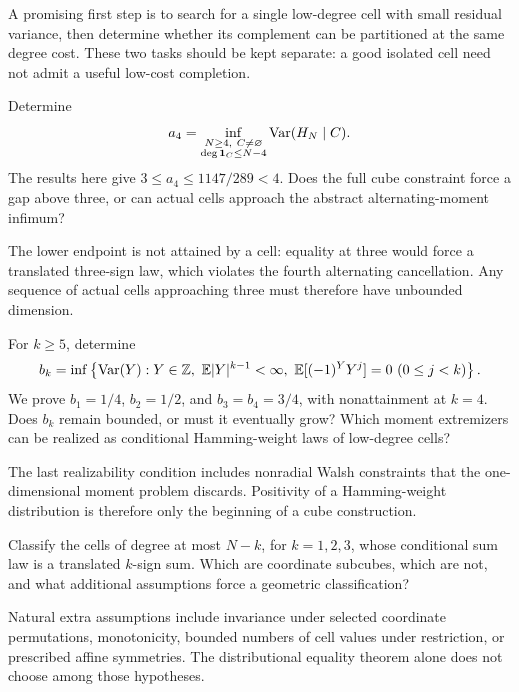 A promising first step is to search for a single low-degree cell with
small residual variance, then determine whether its complement can
be partitioned at the same degree cost. These two tasks should be
kept separate: a good isolated cell need not admit a useful low-cost
completion.

\begin{question}
Determine
\[
 a_4=\inf_{\substack{N\ge4,\ C\ne\varnothing\\
                    \deg\1_C\le N-4}}\Var(H_N\mid C).
\]
The results here give \(3\le a_4\le1147/289<4\).
Does the full cube constraint force a gap above three, or can actual
cells approach the abstract alternating-moment infimum?
\end{question}

The lower endpoint is not attained by a cell: equality at three
would force a translated three-sign law, which violates the fourth
alternating cancellation. Any sequence of actual cells approaching
three must therefore have unbounded dimension.

\begin{question}
For \(k\ge5\), determine
\[
 b_k=\inf\left\{\operatorname{Var}(Y):
  Y\in\mathbb Z,\ \mathbb E|Y|^{k-1}<\infty,\
  \mathbb E[(-1)^YY^j]=0\ (0\le j<k)\right\}.
\]
We prove \(b_1=1/4\), \(b_2=1/2\), and \(b_3=b_4=3/4\),
with nonattainment at \(k=4\). Does \(b_k\) remain bounded,
or must it eventually grow? Which moment extremizers can be realized
as conditional Hamming-weight laws of low-degree cells?
\end{question}

The last realizability condition includes nonradial Walsh constraints
that the one-dimensional moment problem discards. Positivity of a
Hamming-weight distribution is therefore only the beginning of a
cube construction.

\begin{question}
Classify the cells of degree at most \(N-k\), for \(k=1,2,3\),
whose conditional sum law is a translated \(k\)-sign sum.
Which are coordinate subcubes, which are not, and what additional
assumptions force a geometric classification?
\end{question}

Natural extra assumptions include invariance under selected
coordinate permutations, monotonicity, bounded numbers of cell
values under restriction, or prescribed affine symmetries.
The distributional equality theorem alone does not choose among
those hypotheses.

